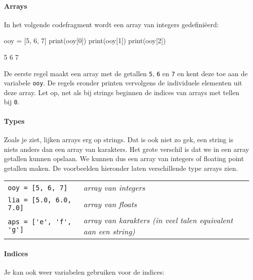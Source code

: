 \paragraph{Arrays}
In het volgende codefragment wordt een array van integers gedefini\"{e}erd:

\begin{minipage}[t]{0.5\textwidth}
\begin{nnflisting}
ooy = [5, 6, 7]
print(ooy[0])
print(ooy[1])
print(ooy[2])
\end{nnflisting}
\end{minipage}
\begin{minipage}[t]{0.5\textwidth}
\begin{listing}
5
6
7
\end{listing}
\end{minipage}

De eerste regel maakt een array met de getallen \texttt{5}, \texttt{6} en \texttt{7} en kent deze toe aan de variabele \texttt{ooy}. De regels eronder printen vervolgens de individuele elementen uit deze array. Let op, net als bij strings beginnen de indices van arrays met tellen bij \texttt{0}.

\paragraph{Types}
Zoals je ziet, lijken arrays erg op strings. Dat is ook niet zo gek, een string is niets anders dan een array van karakters. Het grote verschil is dat we in een array getallen kunnen opslaan. We kunnen dus een array van integers of floating point getallen maken. De voorbeelden hieronder laten verschillende type arrays zien.

\begin{tabular}{l@{\hskip 1em$\rightarrow$\hskip 1em}l}
\verb|ooy = [5, 6, 7]|       & \emph{array van integers} \\
\verb|lia = [5.0, 6.0, 7.0]| & \emph{array van floats} \\
\verb|aps = ['e', 'f', 'g']| & \emph{array van karakters (in veel talen equivalent aan een string)}\\
\end{tabular}

\paragraph{Indices}
Je kan ook weer variabelen gebruiken voor de indices:


